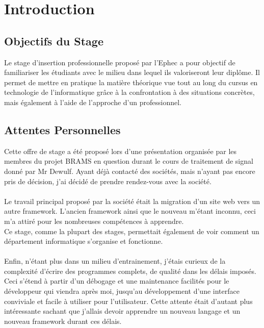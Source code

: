 \documentclass[11pt]{article}
\begin{document}
\newpage

\section{Introduction}

\subsection{Objectifs du Stage}
Le stage d'insertion professionnelle proposé par l'Ephec a pour objectif de familiariser les étudiants avec le milieu dans lequel ils valoriseront leur diplôme.
Il permet de mettre en pratique la matière théorique vue tout au long du cursus en technologie de l'informatique grâce à la confrontation à des situations concrètes, mais également à l'aide de l'approche d'un professionnel.

\subsection{Attentes Personnelles}
Cette offre de stage a été proposé lors d'une présentation organisée par les membres du projet BRAMS en question durant le cours de traitement de signal donné par Mr Dewulf.
Ayant déjà contacté des sociétés, mais n'ayant pas encore pris de décision, j'ai décidé de prendre rendez-vous avec la société.\\
\\
Le travail principal proposé par la société était la migration d'un site web vers un autre framework.
L'ancien framework ainsi que le nouveau m'étant inconnu, ceci m'a attiré pour les nombreuses compétences à apprendre.\\
Ce stage, comme la plupart des stages, permettait également de voir comment un département informatique s'organise et fonctionne.\\
\\
Enfin, n'étant plus dans un milieu d'entrainement, j'étais curieux de la complexité d'écrire des programmes complets, de qualité dans les délais imposés.
Ceci s'étend à partir d'un débogage et une maintenance facilités pour le développeur qui viendra après moi, jusqu'au développement d'une interface conviviale et facile à utiliser pour l'utilisateur.
Cette attente était d'autant plus intéressante sachant que j'allais devoir apprendre un nouveau langage et un nouveau framework durant ces délais.
\end{document}
